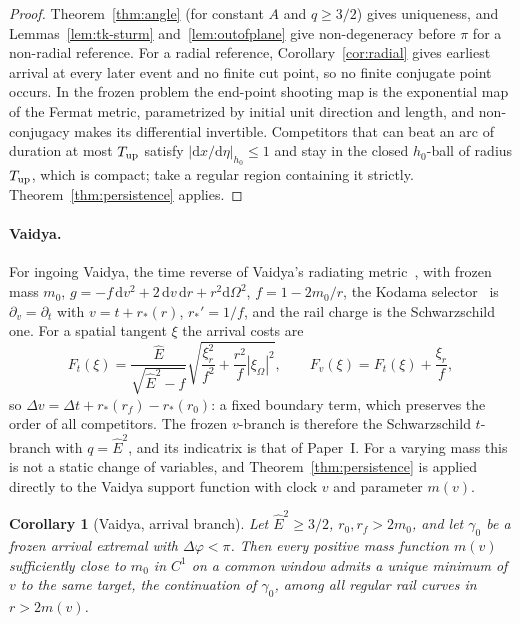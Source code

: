 \documentclass[aip,jmp,amsmath,amssymb,reprint]{revtex4-2}
\newcommand{\Ehat}{\hat E}
\newcommand{\dd}{\mathrm{d}}
\theoremstyle{plain}
\newtheorem{corollary}[proposition]{Corollary}
\theoremstyle{definition}
\begin{document}
\begin{proof}
Theorem~\ref{thm:angle} (for constant $A$ and $q\ge3/2$) gives uniqueness, and Lemmas~\ref{lem:tk-sturm}
and~\ref{lem:outofplane} give non-degeneracy before $\pi$ for a non-radial reference. For a radial reference,
Corollary~\ref{cor:radial} gives earliest arrival at every later event and no finite cut point, so no
finite conjugate point occurs. In the frozen problem the end-point shooting map is the exponential
map of the Fermat metric, parametrized by initial unit direction and length, and non-conjugacy
makes its differential invertible. Competitors that can
beat an arc of duration at most $T_{\rm up}$ satisfy $|\dd x/\dd\eta|_{h_0}\le1$ and stay in
the closed $h_0$-ball of radius $T_{\rm up}$, which is compact; take a regular region
containing it strictly. Theorem~\ref{thm:persistence} applies.
\end{proof}

\paragraph{Vaidya.} For ingoing Vaidya, the time reverse of Vaidya's radiating metric~\cite{Vaidya1951}, with frozen mass $m_0$,
$g=-f\,\dd v^2+2\,\dd v\,\dd r+r^2\dd\Omega^2$, $f=1-2m_0/r$, the Kodama
selector~\cite{Kodama1980,AbreuVisser2010} is $\partial_v=\partial_t$ with $v=t+r_*(r)$, $r_*'=1/f$, and the
rail charge is the Schwarzschild one. For a spatial tangent $\xi$ the arrival costs are
\begin{equation}
  F_t(\xi)=\frac{\Ehat}{\sqrt{\Ehat^2-f}}\sqrt{\frac{\xi_r^2}{f^2}+\frac{r^2}{f}|\xi_\Omega|^2},
  \qquad F_v(\xi)=F_t(\xi)+\frac{\xi_r}{f},
  \label{eq:vaidya-costs}
\end{equation}
so $\Delta v=\Delta t+r_*(r_f)-r_*(r_0)$: a fixed boundary term, which preserves the order of
all competitors. The frozen $v$-branch is therefore the Schwarzschild $t$-branch with
$q=\Ehat^2$, and its indicatrix is that of Paper~I. For a varying mass this is not a static
change of variables, and Theorem~\ref{thm:persistence} is applied directly to the Vaidya
support function with clock $v$ and parameter $m(v)$.

\begin{corollary}[Vaidya, arrival branch]\label{cor:vaidya}
Let $\Ehat^2\ge3/2$, $r_0,r_f>2m_0$, and let $\gamma_0$ be a frozen arrival extremal with
$\Delta\varphi<\pi$. Then every positive mass function $m(v)$ sufficiently close to $m_0$ in
$C^1$ on a common window admits a unique minimum of $v$ to the same target, the continuation
of $\gamma_0$, among all regular rail curves in $r>2m(v)$.
\end{corollary}
\end{document}
